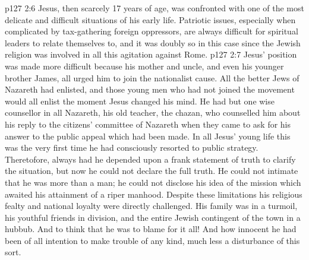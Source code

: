 \vs p127 2:6 Jesus, then scarcely 17 years of age, was confronted with one of the most delicate and difficult situations of his early life. Patriotic issues, especially when complicated by tax\hyp{}gathering foreign oppressors, are always difficult for spiritual leaders to relate themselves to, and it was doubly so in this case since the Jewish religion was involved in all this agitation against Rome.
\vs p127 2:7 Jesus’ position was made more difficult because his mother and uncle, and even his younger brother James, all urged him to join the nationalist cause. All the better Jews of Nazareth had enlisted, and those young men who had not joined the movement would all enlist the moment Jesus changed his mind. He had but one wise counsellor in all Nazareth, his old teacher, the chazan, who counselled him about his reply to the citizens’ committee of Nazareth when they came to ask for his answer to the public appeal which had been made. In all Jesus’ young life this was the very first time he had consciously resorted to public strategy. Theretofore, always had he depended upon a frank statement of truth to clarify the situation, but now he could not declare the full truth. He could not intimate that he was more than a man; he could not disclose his idea of the mission which awaited his attainment of a riper manhood. Despite these limitations his religious fealty and national loyalty were directly challenged. His family was in a turmoil, his youthful friends in division, and the entire Jewish contingent of the town in a hubbub. And to think that he was to blame for it all! And how innocent he had been of all intention to make trouble of any kind, much less a disturbance of this sort.
